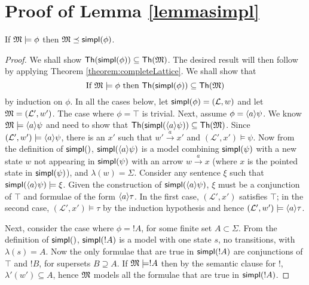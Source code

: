 \section{Proof of Lemma \ref{lemmasimpl}}\label{app:decision:proofs}

If $\frak{M} \models \phi$ then $\frak{M} \preceq \mathsf{simpl}(\phi)$.

\begin{proof}
We shall show $\mathsf{Th}(\mathsf{simpl}(\phi)) \subseteq \mathsf{Th}(\frak{M})$.
The desired result will then follow by applying Theorem \ref{theorem:completeLattice}.
We shall show that
\[
\text{If } \frak{M} \models \phi \text{ then } \mathsf{Th}(\mathsf{simpl}(\phi)) \subseteq \mathsf{Th}(\frak{M})
\]
by induction on $\phi$.
In all the cases below, let $\mathsf{simpl}(\phi) = (\mathcal{L}, w)$ and let $\frak{M} = (\mathcal{L}', w')$.
The case where $\phi = \top$ is trivial.
Next, assume $\phi = \langle a \rangle \psi$.
We know $\frak{M} \models \langle a \rangle \psi$ and need to show that $\mathsf{Th}(\mathsf{simpl}(\langle a \rangle \psi)) \subseteq \mathsf{Th}(\frak{M})$.
Since $(\mathcal{L}', w') \models \langle a \rangle \psi$, there is an $x'$ such that $w' \xrightarrow{a} x'$ and $(\mathcal{L}', x') \models \psi$.
Now from the definition of $\mathsf{simpl}()$, $\mathsf{simpl}(\langle a \rangle \psi)$ is a model combining $\mathsf{simpl}(\psi)$ with a new state $w$ not appearing in $\mathsf{simpl}(\psi)$ with an arrow $w \xrightarrow{a} x$ (where $x$ is the pointed state in $\mathsf{simpl}(\psi)$), and $\lambda(w) = \Sigma$. 
Consider any sentence $\xi$ such that $\mathsf{simpl}(\langle a \rangle \psi) \models \xi$. Given the construction of $\mathsf{simpl}(\langle a \rangle \psi)$, $\xi$ must be a conjunction of $\top$ and formulae of the form $\langle a \rangle \tau$. In the first case, $(\mathcal{L}', x')$ satisfies $\top$; in the second case, $(\mathcal{L}', x') \models \tau$ by the induction hypothesis and hence $(\mathcal{L}', w') \models \langle a \rangle \tau$.

Next, consider the case where $\phi = !A$, for some finite set $A \subset \Sigma$.
From the definition of $\mathsf{simpl}()$, $\mathsf{simpl}(!A)$ is a model with one state $s$, no transitions, with $\lambda(s) = A$.
Now the only formulae that are true in $\mathsf{simpl}(!A)$ are conjunctions of $\top$ and $!B$, for supersets $B \supseteq A$.
If $\frak{M} \models !A$ then by the semantic clause for $!$, $\lambda'(w') \subseteq A$, hence $\frak{M}$ models all the formulae that are true in $\mathsf{simpl}(!A)$.


\end{proof}
